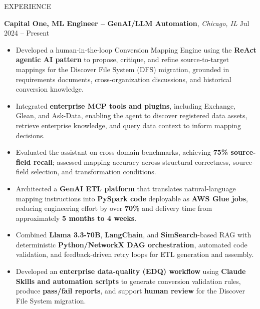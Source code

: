 \documentclass{resume} %
\begin{document}
\vspace{-0.2em}
\begin{rSection}{EXPERIENCE} 

\textbf{Capital One, ML Engineer – GenAI/LLM Automation}, \textit{Chicago, IL} \hfill Jul 2024 – Present
\vspace{-0.5em}

\begin{itemize}
\itemsep -3pt {}
\item Developed a human-in-the-loop Conversion Mapping Engine using the \textbf{ReAct agentic AI pattern} to propose, critique, and refine source-to-target mappings for the Discover File System (DFS) migration, grounded in requirements documents, cross-organization discussions, and historical conversion knowledge.

\item Integrated \textbf{enterprise MCP tools and plugins}, including Exchange, Glean, and Ask-Data, enabling the agent to discover registered data assets, retrieve enterprise knowledge, and query data context to inform mapping decisions.

\item Evaluated the assistant on cross-domain benchmarks, achieving \textbf{75\% source-field recall}; assessed mapping accuracy across structural correctness, source-field selection, and transformation conditions.

\item Architected a \textbf{GenAI ETL platform} that translates natural-language mapping instructions into \textbf{PySpark code} deployable as \textbf{AWS Glue jobs}, reducing engineering effort by over \textbf{70\%} and delivery time from approximately \textbf{5 months to 4 weeks}.

\item Combined \textbf{Llama 3.3-70B}, \textbf{LangChain}, and \textbf{SimSearch}-based RAG with deterministic \textbf{Python/NetworkX DAG orchestration}, automated code validation, and feedback-driven retry loops for ETL generation and assembly.

\item Developed an \textbf{enterprise data-quality (EDQ) workflow} using \textbf{Claude Skills and automation scripts} to generate conversion validation rules, produce \textbf{pass/fail reports}, and support \textbf{human review} for the Discover File System migration.
\end{itemize}


\end{rSection}
\end{document}
